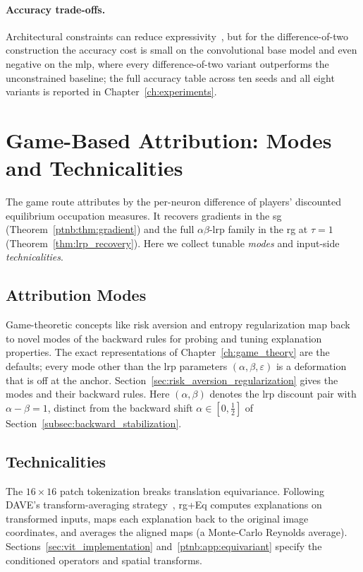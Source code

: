 \paragraph{Accuracy trade-offs.}\label{subsec:dcinn_accuracy}

Architectural constraints can reduce expressivity~\parencite{Sill1997_MonotonicNetworks,Liu2020CertifiedMonotone}, but for the difference-of-two construction the accuracy cost is small on the convolutional base model and even negative on the \ac{mlp}, where every difference-of-two variant outperforms the unconstrained baseline; the full accuracy table across ten seeds and all eight variants is reported in Chapter~\ref{ch:experiments}.



\section{Game-Based Attribution: Modes and Technicalities}\label{sec:game_based_attribution}

The game route attributes by the per-neuron difference of players' discounted equilibrium occupation measures. It recovers gradients in the \ac{sg} (Theorem~\ref{ptnb:thm:gradient}) and the full $\alpha\beta$-\ac{lrp} family in the \ac{rg} at $\tau=1$ (Theorem~\ref{thm:lrp_recovery}). Here we collect tunable \emph{modes} and input-side \emph{technicalities}.

\subsection{Attribution Modes}\label{subsec:attribution_modes}

Game-theoretic concepts like risk aversion and entropy regularization map back to novel modes of the backward rules for probing and tuning explanation properties. The exact representations of Chapter~\ref{ch:game_theory} are the defaults; every mode other than the \ac{lrp} parameters $(\alpha,\beta,\varepsilon)$ is a deformation that is off at the anchor. Section~\ref{sec:risk_aversion_regularization} gives the modes and their backward rules. Here $(\alpha,\beta)$ denotes the \ac{lrp} discount pair with $\alpha-\beta=1$, distinct from the backward shift $\alpha\in[0,\tfrac12]$ of Section~\ref{subsec:backward_stabilization}.

\subsection{Technicalities}\label{subsec:technicalities}

The $16\times16$ patch tokenization breaks translation equivariance. Following DAVE's transform-averaging strategy~\parencite{Wrobel2024}, \ac{rg}+Eq computes explanations on transformed inputs, maps each explanation back to the original image coordinates, and averages the aligned maps (a Monte-Carlo Reynolds average). Sections~\ref{sec:vit_implementation} and~\ref{ptnb:app:equivariant} specify the conditioned operators and spatial transforms.

